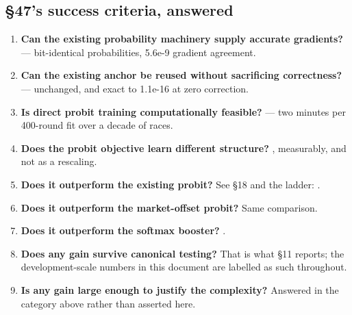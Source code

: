 \subsection*{§47's success criteria, answered}

\begin{enumerate}[leftmargin=1.6em]\itemsep2pt
\item \textbf{Can the existing probability machinery supply accurate gradients?}  --- bit-identical probabilities, 5.6e-9 gradient agreement.
\item \textbf{Can the existing anchor be reused without sacrificing correctness?}  --- unchanged, and exact to 1.1e-16 at zero correction.
\item \textbf{Is direct probit training computationally feasible?}  --- two minutes per 400-round fit over a decade of races.
\item \textbf{Does the probit objective learn different structure?} , measurably, and not as a rescaling.
\item \textbf{Does it outperform the existing probit?} See §18 and the ladder: .
\item \textbf{Does it outperform the market-offset probit?} Same comparison.
\item \textbf{Does it outperform the softmax booster?} .
\item \textbf{Does any gain survive canonical testing?} That is what §11 reports; the development-scale numbers in this document are labelled as such throughout.
\item \textbf{Is any gain large enough to justify the complexity?} Answered in the category above rather than asserted here.
\end{enumerate}


